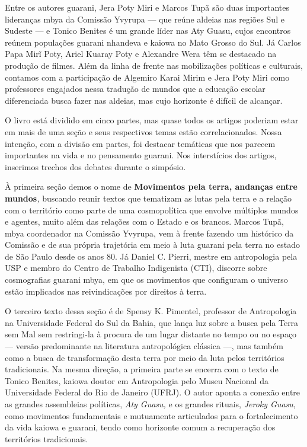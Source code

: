 Entre os autores guarani, Jera Poty Miri e Marcos Tupã são duas
importantes lideranças mbya da Comissão Yvyrupa --- que reúne aldeias
nas regiões Sul e Sudeste --- e Tonico Benites é um grande líder nas Aty
Guasu, cujos encontros reúnem populações guarani nhandeva e kaiowa no
Mato Grosso do Sul. Já Carlos Papa Mirĩ Poty, Ariel Kuaray Poty e
Alexandre Wera têm se destacado na produção de filmes. Além da linha de
frente nas mobilizações políticas e culturais, contamos com a
participação de Algemiro Karai Mirim e Jera Poty Miri como professores
engajados nessa tradução de mundos que a educação escolar diferenciada
busca fazer nas aldeias, mas cujo horizonte é difícil de alcançar.

O livro está dividido em cinco partes, mas quase todos os artigos
poderiam estar em mais de uma seção e seus respectivos temas estão
correlacionados. Nossa intenção, com a divisão em partes, foi destacar
temáticas que nos parecem importantes na vida e no pensamento guarani.
Nos interstícios dos artigos, inserimos trechos dos debates durante o
simpósio.

À primeira seção demos o nome de \textbf{Movimentos pela terra, andanças
entre mundos}\emph{,} buscando reunir textos que tematizam as lutas pela
terra e a relação com o território como parte de uma cosmopolítica que
envolve múltiplos mundos e agentes, muito além das relações com o Estado
e os brancos. Marcos Tupã, mbya coordenador na Comissão Yvyrupa, vem à
frente fazendo um histórico da Comissão e de sua própria trajetória em
meio à luta guarani pela terra no estado de São Paulo desde os anos 80.
Já Daniel C. Pierri, mestre em antropologia pela USP e membro do Centro
de Trabalho Indigenista (CTI), discorre sobre cosmografias guarani mbya,
em que os movimentos que configuram o universo estão implicados nas
reivindicações por direitos à terra.

O terceiro texto dessa seção é de Spensy K. Pimentel, professor de
Antropologia na Universidade Federal do Sul da Bahia, que lança luz
sobre a busca pela Terra sem Mal sem restringi-la à procura de um lugar
distante no tempo ou no espaço --- versão predominante na literatura
antropológica clássica ---, mas também como a busca de transformação
desta terra por meio da luta pelos territórios tradicionais. Na mesma
direção, a primeira parte se encerra com o texto de Tonico Benites,
kaiowa doutor em Antropologia pelo Museu Nacional da Universidade
Federal do Rio de Janeiro (UFRJ). O autor aponta a conexão entre as
grandes assembleias políticas, \emph{Aty Guasu,} e os grandes rituais,
\emph{Jeroky Guasu}, como movimentos fundamentais e mutuamente
articulados para o fortalecimento da vida kaiowa e guarani, tendo como
horizonte comum a recuperação dos territórios tradicionais.

